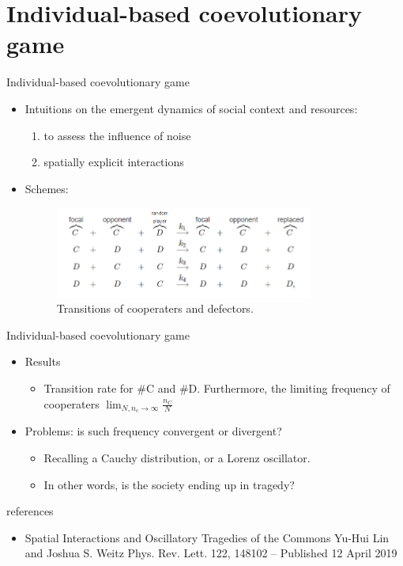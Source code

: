 \documentclass{beamer}
\begin{document}
\section{Individual-based coevolutionary game}
\begin{frame}{Individual-based coevolutionary game}
    \begin{itemize}
        \item Intuitions on the emergent dynamics of social context and resources:
        \begin{enumerate}
            \item to assess the influence of noise
            \item spatially explicit interactions
        \end{enumerate}
        \item Schemes:
        \begin{figure}
            \centering
            \includegraphics[height = 3cm]{scheme.PNG}
            \caption{Transitions of cooperaters and defectors.}
        \end{figure}
    \end{itemize}
\end{frame}

\begin{frame}{Individual-based coevolutionary game}
    \begin{itemize}
        \item Results
        \begin{itemize}
            \item Transition rate for \#C and \#D. Furthermore, the limiting frequency of cooperaters $\lim_{N,n_c\rightarrow \infty}\frac{n_C}{N} $
        \end{itemize}
        \item Problems: is such frequency convergent or divergent?
        \begin{itemize}
            \item Recalling a Cauchy distribution, or a Lorenz oscillator.
            \item In other words, is the society ending up in tragedy?
        \end{itemize}
    \end{itemize}
\end{frame}

\begin{frame}{references}
    \begin{itemize}
        \item Spatial Interactions and Oscillatory Tragedies of the Commons
        Yu-Hui Lin and Joshua S. Weitz
        Phys. Rev. Lett. 122, 148102 – Published 12 April 2019
    \end{itemize}
\end{frame}
\end{document}
